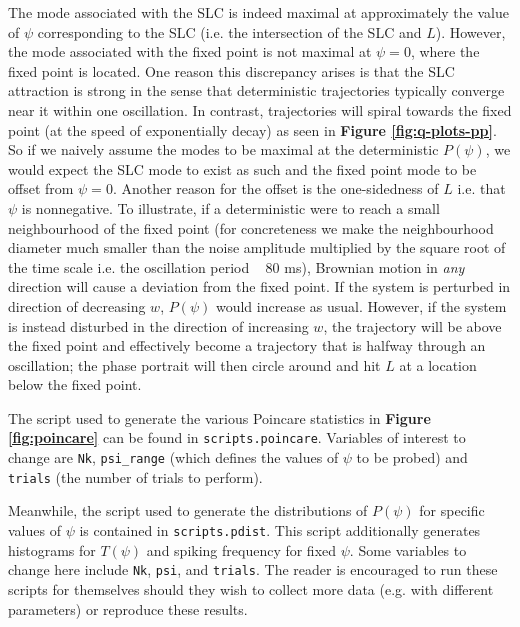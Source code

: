 \documentclass[letterpaper,12pt]{article}
\numberwithin{table}{section}
\numberwithin{figure}{section}
\numberwithin{equation}{section}
\newcommand{\reffig}[1]{\textbf{Figure \ref{#1}}}
\begin{document}
\begin{flushleft}
    The mode associated with the SLC is indeed maximal at approximately the value of $\psi$ corresponding to the SLC (i.e. the intersection of the SLC and $L$). However, the mode associated with the fixed point is not maximal at $\psi = 0$, where the fixed point is located. One reason this discrepancy arises is that the SLC attraction is strong in the sense that deterministic trajectories typically converge near it within one oscillation. In contrast, trajectories will spiral towards the fixed point (at the speed of exponentially decay) as seen in \reffig{fig:q-plots-pp}. So if we naively assume the modes to be maximal at the deterministic $P(\psi)$, we would expect the SLC mode to exist as such and the fixed point mode to be offset from $\psi = 0$. Another reason for the offset is the one-sidedness of $L$ i.e. that $\psi$ is nonnegative. To illustrate, if a deterministic were to reach a small neighbourhood of the fixed point (for concreteness we make the neighbourhood diameter much smaller than the noise amplitude multiplied by the square root of the time scale i.e. the oscillation period ~ 80 ms), Brownian motion in \textit{any} direction will cause a deviation from the fixed point. If the system is perturbed in direction of decreasing $w$, $P(\psi)$ would increase as usual. However, if the system is instead disturbed in the direction of increasing $w$, the trajectory will be above the fixed point and effectively become a trajectory that is halfway through an oscillation; the phase portrait will then circle around and hit $L$ at a location below the fixed point.

    The script used to generate the various Poincare statistics in \reffig{fig:poincare} can be found in \texttt{scripts.poincare}. Variables of interest to change are \texttt{Nk}, \texttt{psi\_range} (which defines the values of $\psi$ to be probed) and \texttt{trials} (the number of trials to perform). 
    
    Meanwhile, the script used to generate the distributions of $P(\psi)$ for specific values of $\psi$ is contained in \texttt{scripts.pdist}. This script additionally generates histograms for $T(\psi)$ and spiking frequency for fixed $\psi$. Some variables to change here include \texttt{Nk}, \texttt{psi}, and \texttt{trials}. The reader is encouraged to run these scripts for themselves should they wish to collect more data (e.g. with different parameters) or reproduce these results.

    \pagebreak


\end{flushleft}
\end{document}
